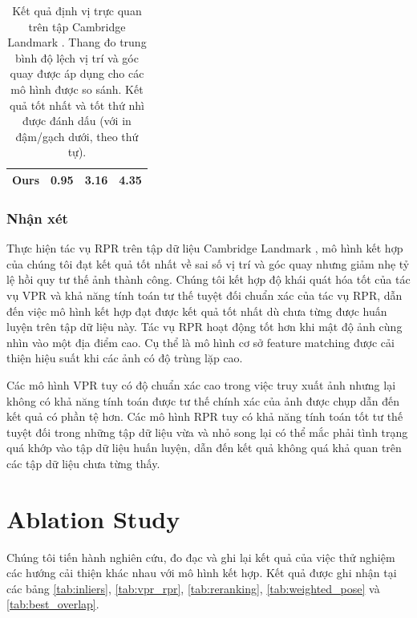 \begin{table}
\begin{tabular}{|l|c|c|c|}
        Ours                                   & 0.95                                                                & \textbf{3.16}                                                            & \textbf{4.35}                                                                 \\ \hline
    \end{tabular}
    \vspace{10pt}
    \caption[Kết quả định vị trực quan trên tập Cambridge Landmark]{Kết quả định vị trực quan trên tập Cambridge Landmark \cite{kendall2016posenet}. Thang đo trung bình độ lệch vị trí và góc quay được áp dụng cho các mô hình được so sánh. Kết quả tốt nhất và tốt thứ nhì được đánh dấu (với in đậm/gạch dưới, theo thứ tự).}
    \label{tab:cambridge_vpr_comparison}
\end{table}
\egroup

\subsubsection*{Nhận xét}
Thực hiện tác vụ RPR trên tập dữ liệu Cambridge Landmark \cite{kendall2016posenet}, mô hình kết hợp của chúng tôi đạt kết quả tốt nhất về sai số vị trí và góc quay nhưng giảm nhẹ tỷ lệ hồi quy tư thế ảnh thành công. Chúng tôi kết hợp độ khái quát hóa tốt của tác vụ VPR và khả năng tính toán tư thế tuyệt đối chuẩn xác của tác vụ RPR, dẫn đến việc mô hình kết hợp đạt được kết quả tốt nhất dù chưa từng được huấn luyện trên tập dữ liệu này. Tác vụ RPR hoạt động tốt hơn khi mật độ ảnh cùng nhìn vào một địa điểm cao. Cụ thể là mô hình cơ sở feature matching được cải thiện hiệu suất khi các ảnh có độ trùng lặp cao.

Các mô hình VPR tuy có độ chuẩn xác cao trong việc truy xuất ảnh nhưng lại không có khả năng tính toán được tư thế chính xác của ảnh được chụp dẫn đến kết quả có phần tệ hơn. Các mô hình RPR tuy có khả năng tính toán tốt tư thế tuyệt đối trong những tập dữ liệu vừa và nhỏ song lại có thể mắc phải tình trạng quá khớp vào tập dữ liệu huấn luyện, dẫn đến kết quả không quá khả quan trên các tập dữ liệu chưa từng thấy.

\section{Ablation Study}
Chúng tôi tiến hành nghiên cứu, đo đạc và ghi lại kết quả của việc thử nghiệm các hướng cải thiện khác nhau với mô hình kết hợp. Kết quả được ghi nhận tại các bảng \ref{tab:inliers}, \ref{tab:vpr_rpr}, \ref{tab:reranking}, \ref{tab:weighted_pose} và \ref{tab:best_overlap}.

